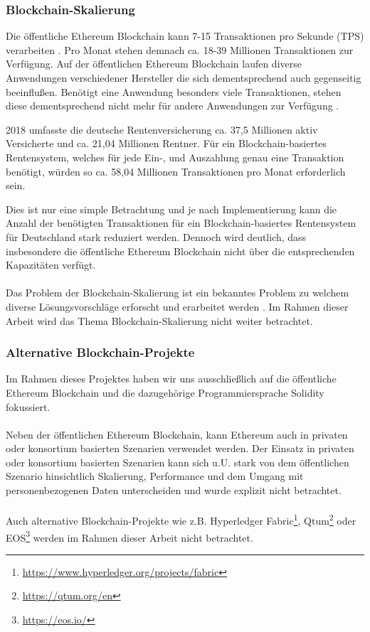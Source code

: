 \subsubsection{Blockchain-Skalierung}
Die öffentliche Ethereum Blockchain kann 7-15 Transaktionen pro Sekunde (TPS) verarbeiten \cite{vitalikscale}. Pro Monat stehen demnach ca. 18-39 Millionen Transaktionen zur Verfügung. Auf der öffentlichen Ethereum Blockchain laufen diverse Anwendungen verschiedener Hersteller die sich dementsprechend auch gegenseitig beeinflußen. Benötigt eine Anwendung besonders viele Transaktionen, stehen diese dementsprechend nicht mehr für andere Anwendungen zur Verfügung \cite{cryptokitty}.  

2018 umfasste die deutsche Rentenversicherung ca. 37,5 Millionen aktiv Versicherte und ca. 21,04 Millionen Rentner. \cite{rente2018,rentezahlen2019} Für ein Blockchain-basiertes Rentensystem, welches für jede Ein-, und Auszahlung genau eine Transaktion benötigt, würden so ca. 58,04 Millionen Transaktionen pro Monat erforderlich sein.

Dies ist nur eine simple Betrachtung und je nach Implementierung kann die Anzahl der benötigten Transaktionen für ein Blockchain-basiertes Rentensystem für Deutschland stark reduziert werden. Dennoch wird deutlich, dass insbesondere die öffentliche Ethereum Blockchain nicht über die entsprechenden Kapazitäten verfügt.

\paragraph*{}
Das Problem der Blockchain-Skalierung ist ein bekanntes Problem zu welchem diverse Lösungsvorschläge erforscht und erarbeitet werden \cite{scaling}. Im Rahmen dieser Arbeit wird das Thema Blockchain-Skalierung nicht weiter betrachtet.

\subsubsection{Alternative Blockchain-Projekte}
Im Rahmen dieses Projektes haben wir uns ausschließlich auf die öffentliche Ethereum Blockchain und die dazugehörige Programmiersprache Solidity fokussiert.

\paragraph*{}
Neben der öffentlichen Ethereum Blockchain, kann Ethereum auch in privaten oder konsortium basierten Szenarien verwendet werden. Der Einsatz in privaten oder konsortium basierten Szenarien kann sich u.U. stark von dem öffentlichen Szenario hinsichtlich Skalierung, Performance und dem Umgang mit personenbezogenen Daten unterscheiden und wurde explizit nicht betrachtet.

\paragraph*{}
Auch alternative Blockchain-Projekte wie z.B. 
Hyperledger Fabric\footnote{\url{https://www.hyperledger.org/projects/fabric}}, 
Qtum\footnote{\url{https://qtum.org/en}}
oder EOS\footnote{\url{https://eos.io/}}
werden im Rahmen dieser Arbeit nicht betrachtet. 